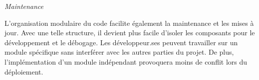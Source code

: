 \emph{Maintenance}

L'organisation modulaire du code facilite également la maintenance et
les mises à jour. Avec une telle structure, il devient plus facile
d'isoler les composants pour le développement et le débogage. Les
développeur.ses peuvent travailler sur un module spécifique sans interférer
avec les autres parties du projet. De plus,
l'implémentation d'un module indépendant provoquera moins de conflit
lors du déploiement.
